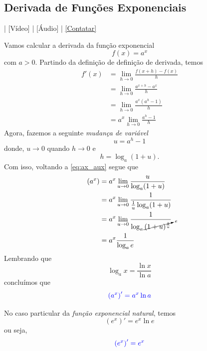 \subsection{Derivada de Funções Exponenciais}

\begin{flushright}
  [YouTube] | [Vídeo] | [Áudio] | \href{https://phkonzen.github.io/notas/contato.html}{[Contatar]}
\end{flushright}

Vamos calcular a derivada da função exponencial
\begin{equation}
  f(x) = a^x
\end{equation}
com $a>0$. Partindo da definição de definição de derivada, temos
\begin{align}
  f'(x) &= \lim_{h\to 0}\frac{f(x+h)-f(x)}{h}\\
        &= \lim_{h\to 0}\frac{a^{x+h}-a^x}{h}\\
        &= \lim_{h\to 0}\frac{a^x\left(a^h-1\right)}{h}\\
        &= a^x\lim_{h\to 0}\frac{a^h-1}{h}\label{eq:ax_aux}
\end{align}
Agora, fazemos a seguinte \emph{mudança de variável}
\begin{equation}
  u = a^h-1
\end{equation}
donde, $u\to 0$ quando $h\to 0$ e
\begin{equation}
  h = \log_a(1 + u).
\end{equation}
Com isso, voltando a \eqref{eq:ax_aux} segue que
\begin{align}
  \left(a^x\right) &= a^x\lim_{u\to 0}\frac{u}{\log_a(1+u)}\\
                   &= a^x\lim_{u\to 0}\frac{1}{\frac{1}{u}\log_a(1+u)}\\
                   &= a^x\lim_{u\to 0}\frac{1}{\log_a\cancelto{e}{(1+u)^{\frac{1}{u}}}}\\
                   &= a^x\frac{1}{\log_a e}
\end{align}
Lembrando que
\begin{equation}
  \log_a x = \frac{\ln x}{\ln a}
\end{equation}
concluímos que
\begin{equation}
  {\color{blue}\left(a^x\right)' = a^x\ln a}
\end{equation}

No caso particular da \emph{função exponencial natural}, temos
\begin{equation}
  \left(e^x\right)' = e^x\ln e
\end{equation}
ou seja,
\begin{equation}
  {\color{blue}\left(e^x\right)' = e^x}
\end{equation}


